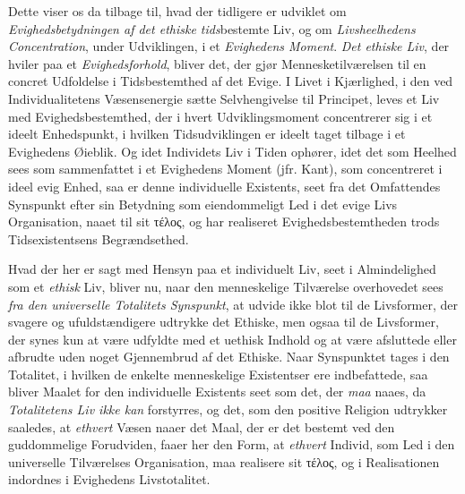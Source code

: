 Dette viser os da tilbage til, hvad der tidligere er udviklet om
\emph{Evighedsbetydningen af det ethiske tids}bestemte Liv, og om
\emph{Livsheelhedens Concentration}, under Udviklingen, i et \emph{Evighedens
Moment}. \emph{Det ethiske Liv}, der hviler paa et \emph{Evighedsforhold}, bliver
det, der gjør Mennesketilværelsen til en concret Udfoldelse i Tidsbestemthed af
det Evige. I Livet i Kjærlighed, i den ved Individualitetens Væsensenergie sætte
Selvhengivelse til Principet, leves et Liv med Evighedsbestemthed, der i hvert
Udviklingsmoment concentrerer sig i et ideelt Enhedspunkt, i hvilken
Tidsudviklingen er ideelt taget tilbage i et Evighedens Øieblik. Og idet
Individets Liv i Tiden ophører, idet det som Heelhed sees som sammenfattet i et
Evighedens Moment (jfr. Kant), som concentreret i ideel evig Enhed, saa er denne
individuelle Existents, seet fra det Omfattendes Synspunkt efter sin Betydning som
eiendommeligt Led i det evige Livs Organisation, naaet til sit τέλος, og har
realiseret Evighedsbestemtheden trods Tidsexistentsens Begrændsethed.

Hvad der her er sagt med Hensyn paa et individuelt Liv, seet i Almindelighed som
et \emph{ethisk} Liv, bliver nu, naar den menneskelige Tilværelse overhovedet sees
\emph{fra den universelle Totalitets Synspunkt}, at udvide ikke blot til de
Livsformer, der svagere og ufuldstændigere udtrykke det Ethiske, men ogsaa til de
Livsformer, der synes kun at være udfyldte med et uethisk Indhold og at være
afsluttede eller afbrudte uden noget Gjennembrud af det Ethiske. Naar Synspunktet
tages i den Totalitet, i hvilken de enkelte menneskelige Existentser ere
indbefattede, saa bliver Maalet for den individuelle Existents seet som det, der
\emph{maa} naaes, da \emph{Totalitetens Liv ikke kan} forstyrres, og det, som den
positive Religion udtrykker saaledes, at \emph{ethvert} Væsen naaer
 det Maal, der er det bestemt ved den guddommelige Forudviden, faaer her den Form,
at \emph{ethvert} Individ, som Led i den universelle Tilværelses Organisation, maa
realisere sit τέλος, og i Realisationen indordnes i Evighedens Livstotalitet.

